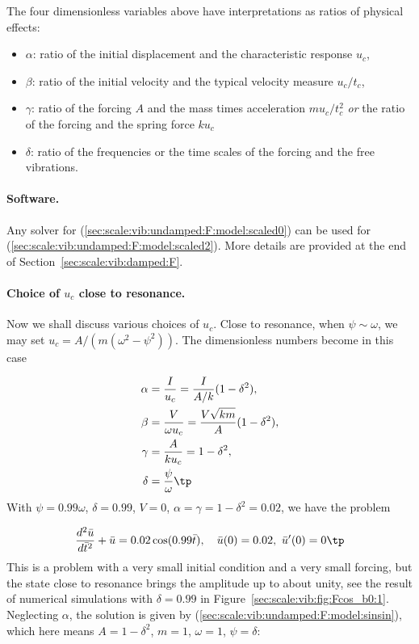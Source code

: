 \documentclass[graybox,envcountchap,sectrefs,final]{svmonodo}
\begin{document}
The four dimensionless variables above have interpretations as ratios of
physical effects:

\begin{itemize}
 \item $\alpha$: ratio of the initial displacement and
   the characteristic response $u_c$,

 \item $\beta$: ratio of the initial velocity
   and the typical velocity measure $u_c/t_c$,

 \item $\gamma$: ratio of
   the forcing $A$ and the mass times acceleration $mu_c/t_c^2$ \emph{or}
   the ratio of the forcing and the spring force $ku_c$

 \item $\delta$: ratio of the
   frequencies or the time scales of the forcing and the free vibrations.
\end{itemize}

\noindent
\paragraph{Software.}
Any solver for (\ref{sec:scale:vib:undamped:F:model:scaled0})
can be used for (\ref{sec:scale:vib:undamped:F:model:scaled2}).
More details are provided at the end of
Section~\ref{sec:scale:vib:damped:F}.

\paragraph{Choice of $u_c$ close to resonance.}
Now we shall discuss various choices of $u_c$.
Close to resonance, when $\psi\sim\omega$, we may set
$u_c=A/(m(\omega^2 - \psi^2))$. The dimensionless numbers
become in this case

\begin{align*}
\alpha &= \frac{I}{u_c} = \frac{I}{A/k}(1-\delta^2),\\ 
\beta  &= \frac{V}{\omega u_c} = \frac{V\sqrt{km}}{A}(1-\delta^2),\\ 
\gamma &= \frac{A}{ku_c} = 1-\delta^2,\\ 
\delta &= \frac{\psi}{\omega}\tp
\end{align*}
With $\psi = 0.99\omega$, $\delta =0.99$, $V=0$,
$\alpha = \gamma = 1-\delta^2 = 0.02$, we have the problem

\[
\frac{d^2\bar u}{d\bar t^2} + \bar u =
0.02 \cos(0.99\bar t),
\quad \bar u(0)=0.02,\ \bar u'(0)=0\tp
\]
This is a problem with a very small initial condition and a very small
forcing, but the state close to resonance brings the amplitude up to
about unity, see the result of numerical simulations with $\delta=0.99$ in
Figure~\ref{sec:scale:vib:fig:Fcos_b0:1}.
Neglecting $\alpha$,
the solution is given by (\ref{sec:scale:vib:undamped:F:model:sinsin}),
which here means $A=1-\delta^2$, $m=1$, $\omega=1$, $\psi=\delta$:
\end{document}
